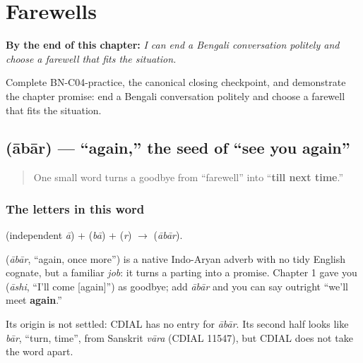 
\chapter{Farewells}
\label{ch:farewells}

\begin{chapteropening}
\textbf{By the end of this chapter:} \emph{I can end a Bengali conversation politely and choose a farewell that fits the situation.}

Complete BN-C04-practice, the canonical closing checkpoint, and demonstrate the chapter promise: end a Bengali conversation politely and choose a farewell that fits the situation.
\end{chapteropening}

\section[\texorpdfstring{\bn{আবার} (ābār)}{আবার (ābār)}]{ (ābār) — \textquotedblleft{}again,\textquotedblright{} the seed of \textquotedblleft{}see you again\textquotedblright{}}

\label{lesson:BN-C04-abar}



\begin{quote}
One small word turns a goodbye from \textquotedblleft{}farewell\textquotedblright{} into \textquotedblleft{}\textbf{till next time}.\textquotedblright{}
\end{quote}

\subsection*{The letters in this word}
\textbf{} (independent \emph{ā}) + \textbf{} (\emph{bā}) + \textbf{} (\emph{r}) $\to$ \textbf{} (\emph{ābār}).

\begin{cousinweb}
\textbf{} (\emph{ābār}, \textquotedblleft{}again, once more\textquotedblright{}) is a native Indo-Aryan adverb with no tidy English cognate, but a familiar \emph{job}: it turns a parting into a promise. Chapter 1 gave you \textbf{} (\emph{āshi}, \textquotedblleft{}I'll come {[}again{]}\textquotedblright{}) as goodbye; add \emph{ābār} and you can say outright \textquotedblleft{}we'll meet \textbf{again}.\textquotedblright{}

Its origin is not settled: CDIAL has no entry for \emph{ābār}. Its second half looks like \emph{bār}, \textquotedblleft{}turn, time\textquotedblright{}, from Sanskrit \emph{vāra} (CDIAL 11547), but CDIAL does not take the word apart.
\end{cousinweb}

